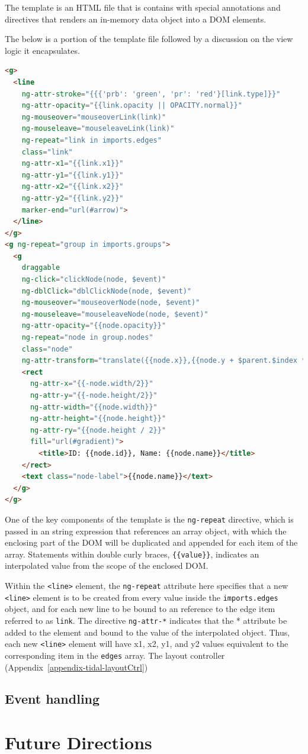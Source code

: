 The template is an HTML file that is contains with special annotations and directives that renders an in-memory data object into a DOM elements.

The below is a portion of the template file followed by a discussion on the view logic it encapsulates.

\begin{lstlisting}[language=html]
<g>
  <line
    ng-attr-stroke="{{{'prb': 'green', 'pr': 'red'}[link.type]}}"
    ng-attr-opacity="{{link.opacity || OPACITY.normal}}"
    ng-mouseover="mouseoverLink(link)"
    ng-mouseleave="mouseleaveLink(link)"
    ng-repeat="link in imports.edges"
    class="link"
    ng-attr-x1="{{link.x1}}"
    ng-attr-y1="{{link.y1}}"
    ng-attr-x2="{{link.x2}}"
    ng-attr-y2="{{link.y2}}"
    marker-end="url(#arrow)">
  </line>
</g>
<g ng-repeat="group in imports.groups">
  <g
    draggable
    ng-click="clickNode(node, $event)"
    ng-dblClick="dblClickNode(node, $event)"
    ng-mouseover="mouseoverNode(node, $event)"
    ng-mouseleave="mouseleaveNode(node, $event)"
    ng-attr-opacity="{{node.opacity}}"
    ng-repeat="node in group.nodes"
    class="node"
    ng-attr-transform="translate({{node.x}},{{node.y + $parent.$index * imports.subgraph.height}})">
    <rect
      ng-attr-x="{{-node.width/2}}"
      ng-attr-y="{{-node.height/2}}"
      ng-attr-width="{{node.width}}"
      ng-attr-height="{{node.height}}"
      ng-attr-ry="{{node.height / 2}}"
      fill="url(#gradient)">
        <title>ID: {{node.id}}, Name: {{node.name}}</title>
    </rect>
    <text class="node-label">{{node.name}}</text>
  </g>
</g>

\end{lstlisting}

One of the key components of the template is the \texttt{ng-repeat} directive, which is passed in an string expression that references an array object, with which the enclosing part of the DOM will be duplicated and appended for each item of the array. 
Statements within double curly braces, \texttt{\{\{value\}\}}, indicates an interpolated value from the scope of the enclosed DOM.

Within the \texttt{<line>} element, the \texttt{ng-repeat} attribute here specifies that a new \texttt{<line>} element is to be created from every value inside the \texttt{imports.edges} object, and for each new line to be bound to an reference to the edge item referred to as \texttt{link}.
The directive \texttt{ng-attr-*} indicates that the * attribute be added to the element and bound to the value of the interpolated object. Thus, each new \texttt{<line>} element will have x1, x2, y1, and y2 values equivalent to the corresponding item in the \texttt{edges} array. The layout controller (Appendix~\ref{appendix-tidal-layoutCtrl}) 


\subsection{Event handling}

\section{Future Directions}


